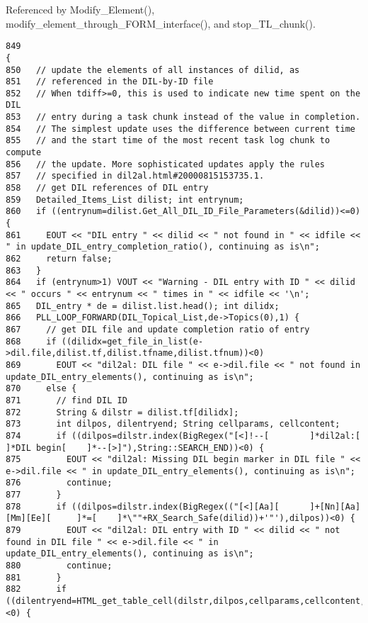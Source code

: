 Referenced by Modify\_\-Element(), modify\_\-element\_\-through\_\-FORM\_\-interface(), and stop\_\-TL\_\-chunk().



\footnotesize\begin{verbatim}849                                                                                                                                                                        {
850   // update the elements of all instances of dilid, as
851   // referenced in the DIL-by-ID file
852   // When tdiff>=0, this is used to indicate new time spent on the DIL
853   // entry during a task chunk instead of the value in completion.
854   // The simplest update uses the difference between current time
855   // and the start time of the most recent task log chunk to compute
856   // the update. More sophisticated updates apply the rules
857   // specified in dil2al.html#20000815153735.1.
858   // get DIL references of DIL entry
859   Detailed_Items_List dilist; int entrynum;
860   if ((entrynum=dilist.Get_All_DIL_ID_File_Parameters(&dilid))<=0) {
861     EOUT << "DIL entry " << dilid << " not found in " << idfile << " in update_DIL_entry_completion_ratio(), continuing as is\n";
862     return false;
863   }
864   if (entrynum>1) VOUT << "Warning - DIL entry with ID " << dilid << " occurs " << entrynum << " times in " << idfile << '\n';
865   DIL_entry * de = dilist.list.head(); int dilidx;
866   PLL_LOOP_FORWARD(DIL_Topical_List,de->Topics(0),1) {
867     // get DIL file and update completion ratio of entry
868     if ((dilidx=get_file_in_list(e->dil.file,dilist.tf,dilist.tfname,dilist.tfnum))<0)
869       EOUT << "dil2al: DIL file " << e->dil.file << " not found in update_DIL_entry_elements(), continuing as is\n";
870     else {
871       // find DIL ID
872       String & dilstr = dilist.tf[dilidx];
873       int dilpos, dilentryend; String cellparams, cellcontent;
874       if ((dilpos=dilstr.index(BigRegex("[<]!--[        ]*dil2al:[      ]*DIL begin[    ]*--[>]"),String::SEARCH_END))<0) {
875         EOUT << "dil2al: Missing DIL begin marker in DIL file " << e->dil.file << " in update_DIL_entry_elements(), continuing as is\n";
876         continue;
877       }
878       if ((dilpos=dilstr.index(BigRegex(("[<][Aa][      ]+[Nn][Aa][Mm][Ee][     ]*=[    ]*\""+RX_Search_Safe(dilid))+'"'),dilpos))<0) {
879         EOUT << "dil2al: DIL entry with ID " << dilid << " not found in DIL file " << e->dil.file << " in update_DIL_entry_elements(), continuing as is\n";
880         continue;
881       }
882       if ((dilentryend=HTML_get_table_cell(dilstr,dilpos,cellparams,cellcontent,&dilpos))<0) {

\end{verbatim}
